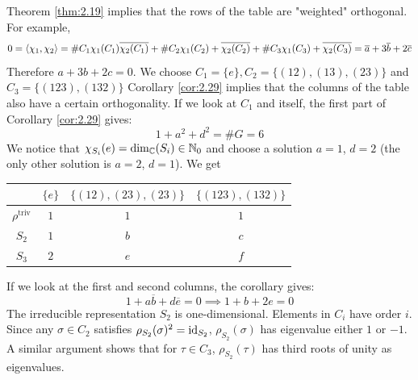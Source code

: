 \documentclass[twoside = false,	%
		headsepline,		%
		parskip = true,
		]{scrbook}						%
\begin{document}
    Theorem \ref{thm:2.19} implies that the rows of the table are "weighted" orthogonal. For example,
    \begin{equation*}
        0 = \left\langle \chi_1,\chi_2\right\rangle = \#C_1 \chi_1(C_1) \overline{\chi_2 (C_1)} + \#C_2 \chi_1(C_2) + \overline{\chi_2(C_2)} + \#C_3 \chi_1(C_3) + \overline{\chi_2(C_3)} = \overline{a} + 3 \overline{b} + 2 \overline{c} 
    \end{equation*}
    Therefore $a + 3b + 2c = 0$.
    We choose $C_1 = \{e\}, C_2 = \{(12),(13),(23)\}$ and $C_3 = \{(123),(132)\}$
    Corollary \ref{cor:2.29} implies that the columns of the table also have a certain orthogonality. If we look at $C_1$ and itself, the first part of Corollary \ref{cor:2.29} gives:
    \begin{equation*}
        1 + a^2 + d^2 = \#G = 6
    \end{equation*}
    We notice that $\chi_{S_i}(e) = \dim_\mathbb C(S_i) \in \mathbb N_0$ and choose a solution $a=1$, $d=2$ (the only other solution is $a=2$, $d=1$).
    We get
    \begin{table}[ht]
        \centering
        \begin{tabular}{|c|c|c|c|}
        \hline
             & $\{e\}$ & $\{(12),(23),(23)\}$ & $\{(123),(132)\}$  \\ \hline
            $\rho^{\text{triv}}$ & $1$ & $1$ & $1$  \\ \hline
            $S_2$ & $1$ & $b$ & $c$ \\ \hline 
            $S_3$ & $2$ & $e$ & $f$ \\ \hline
        \end{tabular}
    \end{table}

    
    If we look at the first and second columns, the corollary gives:
    \begin{equation*}
        1 + a\overline{b} + d \overline{e} = 0 \implies 1 + b + 2e = 0
    \end{equation*}
    The irreducible representation $S_2$ is one-dimensional.
    Elements in $C_i$ have order $i$. Since any $\sigma \in C_2$ satisfies $\rho_{S_2}(\sigma)^2 = \mathrm{id}_{S_2}$, $\rho_{S_2}(\sigma)$ has eigenvalue either $1$ or $-1$. A similar argument shows that for $\tau \in C_3$, $\rho_{S_2}(\tau)$ has third roots of unity as eigenvalues.
\end{document}
